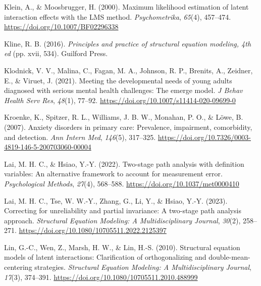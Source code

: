 \documentclass[
  man]{apa7}
\newlength{\cslhangindent}
\newlength{\cslentryspacingunit} %
\newenvironment{CSLReferences}[2] %
 {%
  \setlength{\parindent}{0pt}
  \ifodd #1
  \let\oldpar\par
  \def\par{\hangindent=\cslhangindent\oldpar}
  \fi
  \setlength{\parskip}{#2\cslentryspacingunit}
 }%
 {}
\begin{document}
\begin{CSLReferences}{1}{0}
\leavevmode{}%
Klein, A., \& Moosbrugger, H. (2000). Maximum likelihood estimation of latent interaction effects with the {LMS} method. \emph{Psychometrika}, \emph{65}(4), 457--474. \url{https://doi.org/10.1007/BF02296338}

\leavevmode{}%
Kline, R. B. (2016). \emph{Principles and practice of structural equation modeling, 4th ed} (pp. xvii, 534). Guilford Press.

\leavevmode{}%
Klodnick, V. V., Malina, C., Fagan, M. A., Johnson, R. P., Brenits, A., Zeidner, E., \& Viruet, J. (2021). Meeting the developmental needs of young adults diagnosed with serious mental health challenges: The emerge model. \emph{J Behav Health Serv Res}, \emph{48}(1), 77--92. \url{https://doi.org/10.1007/s11414-020-09699-0}

\leavevmode{}%
Kroenke, K., Spitzer, R. L., Williams, J. B. W., Monahan, P. O., \& Löwe, B. (2007). Anxiety disorders in primary care: {Prevalence}, impairment, comorbidity, and detection. \emph{Ann Intern Med}, \emph{146}(5), 317--325. \url{https://doi.org/10.7326/0003-4819-146-5-200703060-00004}

\leavevmode{}%
Lai, M. H. C., \& Hsiao, Y.-Y. (2022). Two-stage path analysis with definition variables: {An} alternative framework to account for measurement error. \emph{Psychological Methods}, \emph{27}(4), 568--588. \url{https://doi.org/10.1037/met0000410}

\leavevmode{}%
Lai, M. H. C., Tse, W. W.-Y., Zhang, G., Li, Y., \& Hsiao, Y.-Y. (2023). Correcting for unreliability and partial invariance: {A} two-stage path analysis approach. \emph{Structural Equation Modeling: A Multidisciplinary Journal}, \emph{30}(2), 258--271. \url{https://doi.org/10.1080/10705511.2022.2125397}

\leavevmode{}%
Lin, G.-C., Wen, Z., Marsh, H. W., \& Lin, H.-S. (2010). Structural equation models of latent interactions: {Clarification} of orthogonalizing and double-mean-centering strategies. \emph{Structural Equation Modeling: A Multidisciplinary Journal}, \emph{17}(3), 374--391. \url{https://doi.org/10.1080/10705511.2010.488999}


\end{CSLReferences}
\end{document}
